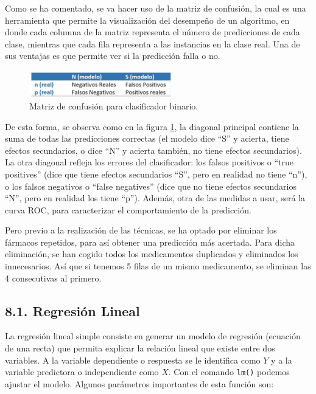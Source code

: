 \documentclass[spanish,]{article}
\begin{document}
Como se ha comentado, se va hacer uso de la matriz de confusión, la cual
es una herramienta que permite la visualización del desempeño de un
algoritmo, en donde cada columna de la matriz representa el número de
predicciones de cada clase, mientras que cada fila representa a las
instancias en la clase real. Una de sus ventajas es que permite ver si
la predicción falla o no.

\begin{figure}[h]
    \centering
    \includegraphics[width=0.55\textwidth]{imagenes/regresion/2.png}
    \caption{Matriz de confusión para clasificador binario.}
    \label{2}
\end{figure}

De esta forma, se observa como en la figura \ref{2}, la diagonal
principal contiene la suma de todas las predicciones correctas (el
modelo dice ``S'' y acierta, tiene efectos secundarios, o dice ``N'' y
acierta también, no tiene efectos secundarios). La otra diagonal refleja
los errores del clasificador: los falsos positivos o ``true positives''
(dice que tiene efectos secundarios ``S'', pero en realidad no tiene
``n''), o los falsos negativos o ``false negatives'' (dice que no tiene
efectos secundarios ``N'', pero en realidad los tiene ``p''). Además,
otra de las medidas a usar, será la curva ROC, para caracterizar el
comportamiento de la predicción.

Pero previo a la realización de las técnicas, se ha optado por eliminar
los fármacos repetidos, para así obtener una predicción más acertada.
Para dicha eliminación, se han cogido todos los medicamentos duplicados
y eliminados los innecesarios. Así que si tenemos 5 filas de un mismo
medicamento, se eliminan las 4 consecutivas al primero.

\subsection{8.1. Regresión Lineal}\label{regresion-lineal}

La regresión lineal simple consiste en generar un modelo de regresión
(ecuación de una recta) que permita explicar la relación lineal que
existe entre dos variables. A la variable dependiente o respuesta se le
identifica como \(Y\) y a la variable predictora o independiente como
\(X\). Con el comando \texttt{lm()} podemos ajustar el modelo. Algunos
parámetros importantes de esta función son:
\end{document}
